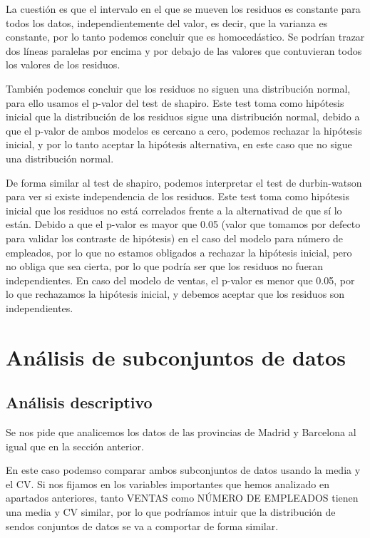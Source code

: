 \documentclass{article}
\begin{document}
La cuestión es que el intervalo en el que se mueven los residuos es constante para todos los datos, independientemente del valor, es decir, que la varianza es constante, por lo tanto podemos concluir que es homocedástico. Se podrían trazar dos líneas paralelas por encima y por debajo de las valores que contuvieran todos los valores de los residuos.

También podemos concluir que los residuos no siguen una distribución normal, para ello usamos el p-valor del test de shapiro. Este test toma como hipótesis inicial que la distribución de los residuos sigue una distribución normal, debido a que el p-valor de ambos modelos es cercano a cero, podemos rechazar la hipótesis inicial, y por lo tanto aceptar la hipótesis alternativa, en este caso que no sigue una distribución normal.

De forma similar al test de shapiro, podemos interpretar el test de durbin-watson para ver si existe independencia de los residuos. Este test toma como hipótesis inicial que los residuos no está correlados frente a la alternativad de que sí lo están. Debido a que el p-valor es mayor que 0.05 (valor que tomamos por defecto para validar los contraste de hipótesis) en el caso del modelo para número de empleados, por lo que no estamos obligados a rechazar la hipótesis inicial, pero no obliga que sea cierta, por lo que podría ser que los residuos no fueran independientes. En caso del modelo de ventas, el p-valor es menor que 0.05, por lo que rechazamos la hipótesis inicial, y debemos aceptar que los residuos son independientes.

\section{Análisis de subconjuntos de datos}

\subsection{Análisis descriptivo}

Se nos pide que analicemos los datos de las provincias de Madrid y Barcelona al igual que en la sección anterior.





\FloatBarrier

En este caso podemso comparar ambos subconjuntos de datos usando la media y el CV. Si nos fijamos en los variables importantes que hemos analizado en apartados anteriores, tanto VENTAS como NÚMERO DE EMPLEADOS tienen una media y CV similar, por lo que podríamos intuir que la distribución de sendos conjuntos de datos se va a comportar de forma similar.
\end{document}
